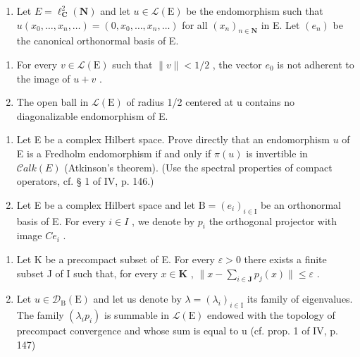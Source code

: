 \exercisesection{}

\begin{enumerate}
\def\labelenumi{\arabic{enumi})}
\tightlist
\item
  Let \(E = \ell_{\mathbf{C}}^{2}(\mathbf{N})\) and let \(u \in \mathcal{L}(\mathrm{E})\) be the endomorphism such that \(u(x_{0}, \ldots, x_{n}, \ldots) = (0, x_{0}, \ldots, x_{n}, \ldots)\) for all \((x_{n})_{n \in \mathbf{N}}\) in E. Let \((e_{n})\) be the canonical orthonormal basis of E.
\end{enumerate}

\begin{enumerate}
\def\labelenumi{\alph{enumi})}
\item
  For every \(v \in \mathcal{L}(\mathrm{E})\) such that \(\|v\| < 1/2\) , the vector \(e_{0}\) is not adherent to the image of \(u + v\) .
\item
  The open ball in \(\mathcal{L}(\mathrm{E})\) of radius 1/2 centered at u contains no diagonalizable endomorphism of E.
\end{enumerate}

\begin{enumerate}
\def\labelenumi{\arabic{enumi})}
\setcounter{enumi}{1}
\item
  Let E be a complex Hilbert space. Prove directly that an endomorphism \(u\) of E is a Fredholm endomorphism if and only if \(\pi(u)\) is invertible in \(\mathcal{C}alk(E)\) (Atkinson's theorem). (Use the spectral properties of compact operators, cf. § 1 of IV, p. 146.)
\item
  Let E be a complex Hilbert space and let \(\mathrm{B}=(e_{i})_{i\in\mathrm{I}}\) be an orthonormal basis of E. For every \(i\in I\) , we denote by \(p_{i}\) the orthogonal projector with image \(Ce_{i}\) .
\end{enumerate}

\begin{enumerate}
\def\labelenumi{\alph{enumi})}
\item
  Let K be a precompact subset of E. For every \(\varepsilon > 0\) there exists a finite subset J of I such that, for every \(x \in \mathbf{K}\) , \(\|x - \sum_{i \in \mathbf{J}} p_j(x)\| \leqslant \varepsilon\) .
\item
  Let \(u \in \mathcal{D}_{\mathrm{B}}(\mathrm{E})\) and let us denote by \(\lambda = (\lambda_{i})_{i \in \mathrm{I}}\) its family of eigenvalues. The family \((\lambda_{i} p_{i})\) is summable in \(\mathcal{L}(\mathrm{E})\) endowed with the topology of precompact convergence and whose sum is equal to u (cf. prop. 1 of IV, p. 147)
\end{enumerate}

